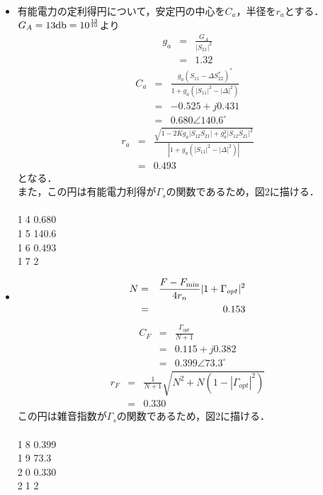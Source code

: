 \begin{itemize}
    \item[3)]
    有能電力の定利得円について，安定円の中心を$C_a$，半径を$r_a$とする．\\
    $G_A=13{\rm db}=10^{\frac{13}{10}}$より
    \begin{eqnarray*}
        g_a&=&\frac{G_A}{|S_{21}|^2}\\
        &=&1.32
    \end{eqnarray*}
    \begin{eqnarray*}
        C_a&=&\frac{g_a(S_{11}-\Delta S^*_{22})^*}{1+g_a(|S_{11}|^2-|\Delta|^2)}\\
        &=&-0.525+j0.431\\
        &=&0.680\angle 140.6^\circ
    \end{eqnarray*}
    \begin{eqnarray*}
        r_a&=&\frac{\sqrt{1-2Kg_a|S_{12}S_{21}|+g_a^2|S_{12}S_{21}|^2}}{|1+g_a(|S_11|^2-|\Delta|^2)|}\\
        &=&0.493
    \end{eqnarray*}
    となる．\\
    また，この円は有能電力利得が$\Gamma_s$の関数であるため，図2に描ける．\\
    \\
    \textcircled{\scriptsize14} 0.680\\
    \textcircled{\scriptsize15} 140.6\\
    \textcircled{\scriptsize16} 0.493\\
    \textcircled{\scriptsize17} 2

    \item[4)]
    \begin{eqnarray*}
        N&=&\frac{F-F_{\rm min}}{4r_n}|1+\Gamma_{opt}|^2\\
        &=&0.153
    \end{eqnarray*}
    \begin{eqnarray*}
        C_F&=&\frac{\Gamma_{opt}}{N+1}\\
        &=&0.115+j0.382\\
        &=&0.399\angle 73.3^\circ
    \end{eqnarray*}
    \begin{eqnarray*}
        r_F&=&\frac{1}{N+1}\sqrt{N^2+N(1-|\Gamma_{opt}|^2)}\\
        &=&0.330
    \end{eqnarray*}
    この円は雑音指数が$\Gamma_s$の関数であるため，図2に描ける．\\
    \\
    \textcircled{\scriptsize18} 0.399\\
    \textcircled{\scriptsize19} 73.3\\
    \textcircled{\scriptsize20} 0.330\\
    \textcircled{\scriptsize21} 2


\end{itemize}
